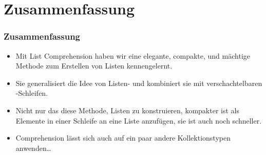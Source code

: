 \documentclass[aspectratio=169,mathserif,notheorems]{beamer}%
\begin{document}
\section{Zusammenfassung}%
%
\begin{frame}%
\frametitle{Zusammenfassung}%
\begin{itemize}%
\item Mit List Comprehension haben wir eine elegante, compakte, und mächtige Methode zum Erstellen von Listen kennengelernt.%
%
\item<2-> Sie generalisiert die Idee von Listen- und kombiniert sie mit verschachtelbaren -Schleifen.%
%
\item<3-> Nicht nur das diese Methode, Listen zu konstruieren, kompakter ist als Elemente in einer Schleife an eine Liste anzufügen, sie ist auch noch schneller.%
%
\item<4-> Comprehension lässt sich auch auf ein paar andere Kollektionstypen anwenden\dots%
\end{itemize}%
\end{frame}%
%
\endPresentation%
\end{document}
